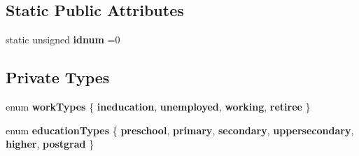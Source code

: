 \subsection*{Static Public Attributes}
\begin{DoxyCompactItemize}
\item 
\mbox{\label{classagent_a4fd7d01331ffd547ae9fc8eb9b05516d}} 
static unsigned {\bfseries idnum} =0
\end{DoxyCompactItemize}
\subsection*{Private Types}
\begin{DoxyCompactItemize}
\item 
\mbox{\label{classagent_a56ecbbe6f1ec07d60ed3c30988810e22}} 
enum {\bfseries work\+Types} \{ {\bfseries ineducation}, 
{\bfseries unemployed}, 
{\bfseries working}, 
{\bfseries retiree}
 \}
\item 
\mbox{\label{classagent_a499a1e074636f81ed46fe569107e6cde}} 
enum {\bfseries education\+Types} \{ \newline
{\bfseries preschool}, 
{\bfseries primary}, 
{\bfseries secondary}, 
{\bfseries uppersecondary}, 
\newline
{\bfseries higher}, 
{\bfseries postgrad}
 \}
\end{DoxyCompactItemize}
